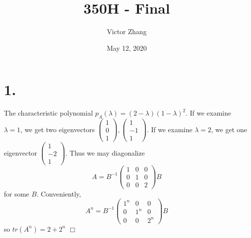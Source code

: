 \documentclass{article}
\title{350H - Final}
\author{Victor Zhang}
\date{May 12, 2020}
\begin{document}
\maketitle

\section*{1.}
The characteristic polynomial $p_A(\lambda) = (2-\lambda)(1-\lambda)^2$. If we examine $\lambda = 1$, we get two eigenvectors $\left( \begin{matrix} 1\\0\\1 \end{matrix}\right), \left( \begin{matrix} 1\\-1\\1 \end{matrix}\right)$. If we examine $\lambda = 2$, we get one eigenvector $\left( \begin{matrix} 1\\-2\\1 \end{matrix}\right)$. Thus we may diagonalize
$$A = B^{-1}\left( \begin{matrix} 1 & 0 & 0 \\ 0 & 1 & 0 \\ 0 & 0 & 2 \end{matrix}\right)B$$
for some $B$. Conveniently, 
$$A^n = B^{-1} \left( \begin{matrix} 1^n & 0 & 0 \\ 0 & 1^n & 0 \\ 0 & 0 & 2^n \end{matrix}\right) B$$
so $tr(A^n) = 2 + 2^n$ $\Box$
\end{document}
